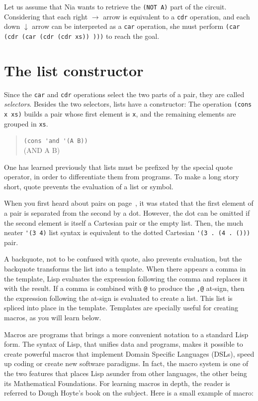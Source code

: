 \documentclass[a4paper,12pt]{book}
\begin{document}
Let us assume that Nia wants to retrieve the
\verb|(NOT A)| part of the circuit. Considering
that each right $\rightarrow$ arrow is equivalent
to a \verb|cdr| operation, and each down $\downarrow$
arrow can be interpreted as a \verb|car| operation,
she must perform \verb|(car (cdr (car (cdr (cdr xs)) )))|
to reach the goal.


\section{The list constructor}
Since the \verb|car| and \verb|cdr| operations
select the two parts of a pair, they are called
{\em selectors}.
Besides the two selectors, lists have a
constructor: The operation \verb|(cons x xs)| builds a pair
whose first element is \verb|x|, and the 
remaining elements are grouped in \verb|xs|.

\begin{quote}
\verb|(cons 'and '(A B))|\\
(AND A B)
\end{quote}

One has learned previously that lists must be
prefixed by the special quote operator,
in order to differentiate them from programs.
To make a long story short, quote  prevents
the evaluation of a list or symbol.

When you first heard about pairs on
page~\pageref{page:cartesian-pair},
it was stated that the first element
of a pair is separated from the 
second by a dot. However, the dot
can be omitted if the second element
is itself a Cartesian pair or
the empty list. Then,
the  much neater 
\verb|'(3 4)| list syntax is equivalent 
to the dotted Cartesian \verb|'(3 . (4 . ()))| pair.

A backquote, not to be confused with quote, also prevents
evaluation, but the backquote transforms the list 
into a template.
When there appears a comma in the 
template, Lisp evaluates the expression following
the comma
and replaces it with the result. 
If a comma is combined with \verb|@| to produce
the \verb|,@| at-sign,
then the expression following the at-sign 
is evaluated to create a list. This list is
spliced into place in the template. 
Templates are specially useful for creating
macros, as you will learn below.

Macros are programs that brings a more convenient
notation to a standard Lisp form. The syntax of Lisp,
that unifies data and programs, makes it possible to
create powerful macros that implement Domain Specific
Languages (DSLs), speed up coding or create new software
paradigms. In fact, the macro system is one of the
two features that places Lisp asunder from other
languages, the other being its Mathematical Foundations.
For learning macros in depth, the reader is referred to
Dough Hoyte's book on the subject\cite{Hoyte}.
Here is a small example of macro:
\end{document}
